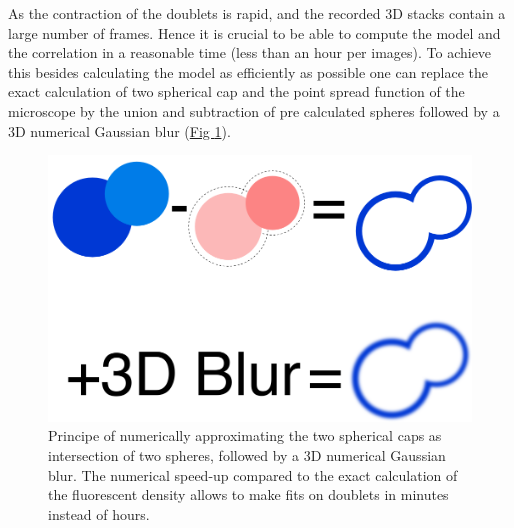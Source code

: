 \documentclass[A4paperpaper,11pt,english]{sphinxmanual}
\begin{document}
As the contraction of the doublets is rapid, and the recorded 3D stacks contain a
large number of frames. Hence it is crucial to be able to compute the model and the
correlation in a reasonable time (less than an hour per images). To
achieve this besides calculating the model as efficiently as possible one can
replace the exact calculation of two spherical cap and the point spread
function of the microscope by the union and subtraction of pre calculated spheres followed by a 3D
numerical Gaussian blur (\hyperref[index-latex:fig-mdl]{Fig  \ref*{index-latex:fig-mdl}}).
\begin{figure}[htbp]
\centering
\capstart

\includegraphics[width=0.600\linewidth]{3dblur.png}
\caption{Principe of numerically approximating the two spherical caps as intersection of two spheres,
followed by a 3D numerical Gaussian blur. The
numerical speed-up compared to the exact calculation of the fluorescent density allows
to make fits on doublets in minutes instead of hours.}\label{index-latex:fig-mdl}\end{figure}
\end{document}
